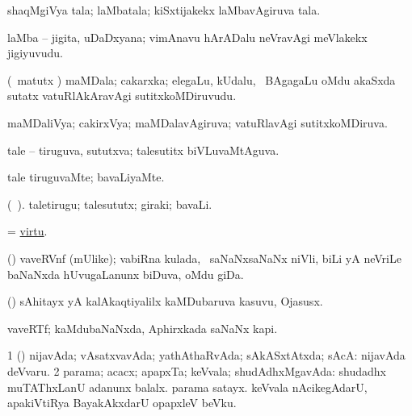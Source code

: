 \bentry
{} 
\gl{\nA}
\expl{}
\bmng
 shaqMgiVya tala; laMbatala; kiSxtijakekx laMbavAgiruva tala. 
\emng
\eentry

\bentry
{}
\gl{\nA}
\expl{}
\bmng
 laMba -- jigita, uDaDxyana; vimAnavu hArADalu neVravAgi meVlakekx jigiyuvudu. 
\emng
\eentry

\bentry
{} 
\gl{\nA}
\bmng
 (\pArxvi\ matutx \savi) maMDala; cakarxka; elegaLu, kUdalu, \mo\ BAgagaLu oMdu akaSxda sutatx vatuRlAkAravAgi sutitxkoMDiruvudu.  
\emng
\eentry

\bentry
{} 
\gl{\gu}
\expl{}
\bmng
 maMDaliVya; cakirxVya; maMDalavAgiruva; vatuRlavAgi sutitxkoMDiruva. 
\emng
\eentry

\bentry
{} 
\gl{\gu}
\expl{}
\bmng
 tale -- tiruguva, sututxva; talesutitx biVLuvaMtAguva. 
\emng
\eentry

\bentry
{} 
\gl{\kirxvi}
\expl{}
\bmng
 tale tiruguvaMte; bavaLiyaMte. 
\emng
\eentry

\bentry
{} 
\gl{\nA}(\bava\ ). 
\bmng
 taletirugu; talesututx; giraki; bavaLi. 
\emng
\eentry

\bentry
{} 
\gl{\nA}
\expl{}
\bmng
 = \hyperlink{virtu}{virtu}. 
\emng
\eentry

\bentry
{} 
\gl{\nA}
\expl{}
\bmng
 (\savi) vaveRVnf (mUlike); vabiRna kulada, \kanmu\ saNaNxsaNaNx niVli, biLi yA neVriLe baNaNxda hUvugaLanunx biDuva, oMdu giDa. 
\emng
\eentry

\bentry
{} 
\gl{\nA}
\expl{}
\bmng
 (\kanmu) sAhitayx yA kalAkaqtiyalilx kaMDubaruva kasuvu, Ojasusx. 
\emng
\eentry

\bentry
{} 
\gl{\nA}
\expl{}
\bmng
 vaveRTf; kaMdubaNaNxda, Aphirxkada saNaNx kapi. 
\emng
\eentry

\bentry
{} 
\gl{\gu}
\expl{}
\bmng
\bnum
\num{1} (\pArxparx) nijavAda; vAsatxvavAda; yathAthaRvAda; sAkASxtAtxda; sAcA:  nijavAda deVvaru. 
\num{2} parama; acacx; apapxTa; keVvala; shudAdhxMgavAda:  shudadhx muTAThxLanU adanunx balalx.  parama satayx.  keVvala nAcikegAdarU, apakiVtiRya BayakAkxdarU opapxleV beVku. 
\enum
\emng

